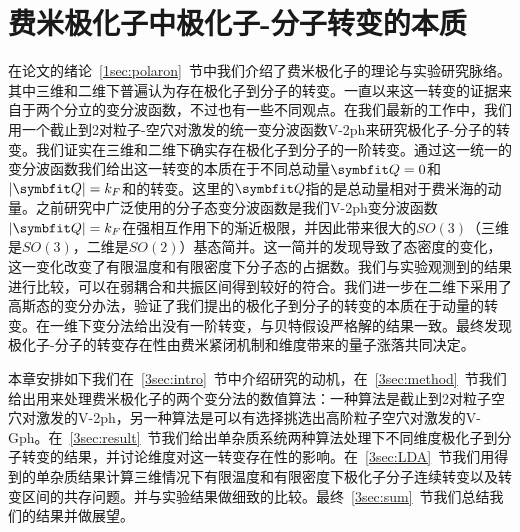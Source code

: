 \chapter{费米极化子中极化子-分子转变的本质}\label{chap:polaron}

在论文的绪论~\ref{1sec:polaron}~节中我们介绍了费米极化子的理论与实验研究脉络。其中三维和二维下普遍认为存在极化子到分子的转变。一直以来这一转变的证据来自于两个分立的变分波函数，不过也有一些不同观点。在我们最新的工作中，我们用一个截止到2对粒子-空穴对激发的统一变分波函数V-2ph来研究极化子-分子的转变。我们证实在三维和二维下确实存在极化子到分子的一阶转变。通过这一统一的变分波函数我们给出这一转变的本质在于不同总动量$\Vector{Q}=0$和$|\Vector{Q}|=k_F$和的转变。这里的$\Vector{Q}$指的是总动量相对于费米海的动量。之前研究中广泛使用的分子态变分波函数是我们V-2ph变分波函数$|\Vector{Q}|=k_F$在强相互作用下的渐近极限，并因此带来很大的$SO(3)$（三维是$SO(3)$，二维是$SO(2)$）基态简并。这一简并的发现导致了态密度的变化，这一变化改变了有限温度和有限密度下分子态的占据数。我们与实验观测到的结果进行比较，可以在弱耦合和共振区间得到较好的符合。我们进一步在二维下采用了高斯态的变分办法，验证了我们提出的极化子到分子的转变的本质在于动量的转变。在一维下变分法给出没有一阶转变，与贝特假设严格解的结果一致。最终发现极化子-分子的转变存在性由费米紧闭机制和维度带来的量子涨落共同决定。

本章安排如下我们在~\ref{3sec:intro}~节中介绍研究的动机，在~\ref{3sec:method}~节我们给出用来处理费米极化子的两个变分法的数值算法：一种算法是截止到2对粒子空穴对激发的V-2ph，另一种算法是可以有选择挑选出高阶粒子空穴对激发的V-Gph。在~\ref{3sec:result}~节我们给出单杂质系统两种算法处理下不同维度极化子到分子转变的结果，并讨论维度对这一转变存在性的影响。在~\ref{3sec:LDA}~节我们用得到的单杂质结果计算三维情况下有限温度和有限密度下极化子分子连续转变以及转变区间的共存问题。并与实验结果做细致的比较。最终~\ref{3sec:sum}~节我们总结我们的结果并做展望。

